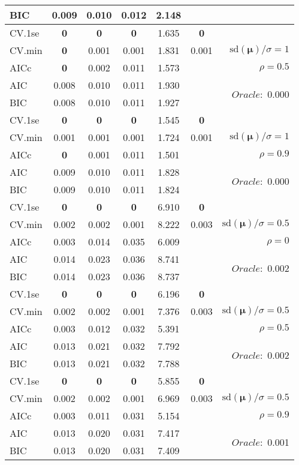 \begin{table}
\begin{center}
\begin{tabular}{l*{5}{c}|r}
BIC & 0.009 & 0.010 & 0.012 & 2.148 & &  \\
 \hline 
CV.1se & {\bf 0} & {\bf 0} & {\bf 0} & 1.635 & {\bf 0} & \\
CV.min & {\bf 0} & 0.001 & 0.001 & 1.831 & 0.001 &  $\mathrm{sd}(\mathbf{\mu})/\sigma=1$ \\
AICc & {\bf 0} & 0.002 & 0.011 & 1.573 & & $\rho=0.5$ \\
AIC & 0.008 & 0.010 & 0.011 & 1.930 & &  \multirow{2}{*}{$Oracle: $ 0.000} \\
BIC & 0.008 & 0.010 & 0.011 & 1.927 & &  \\
 \hline 
CV.1se & {\bf 0} & {\bf 0} & {\bf 0} & 1.545 & {\bf 0} & \\
CV.min & 0.001 & 0.001 & 0.001 & 1.724 & 0.001 &  $\mathrm{sd}(\mathbf{\mu})/\sigma=1$ \\
AICc & {\bf 0} & 0.001 & 0.011 & 1.501 & & $\rho=0.9$ \\
AIC & 0.009 & 0.010 & 0.011 & 1.828 & &  \multirow{2}{*}{$Oracle: $ 0.000} \\
BIC & 0.009 & 0.010 & 0.011 & 1.824 & &  \\
 \hline 
CV.1se & {\bf 0} & {\bf 0} & {\bf 0} & 6.910 & {\bf 0} & \\
CV.min & 0.002 & 0.002 & 0.001 & 8.222 & 0.003 &  $\mathrm{sd}(\mathbf{\mu})/\sigma=0.5$ \\
AICc & 0.003 & 0.014 & 0.035 & 6.009 & & $\rho=0$ \\
AIC & 0.014 & 0.023 & 0.036 & 8.741 & &  \multirow{2}{*}{$Oracle: $ 0.002} \\
BIC & 0.014 & 0.023 & 0.036 & 8.737 & &  \\
 \hline 
CV.1se & {\bf 0} & {\bf 0} & {\bf 0} & 6.196 & {\bf 0} & \\
CV.min & 0.002 & 0.002 & 0.001 & 7.376 & 0.003 &  $\mathrm{sd}(\mathbf{\mu})/\sigma=0.5$ \\
AICc & 0.003 & 0.012 & 0.032 & 5.391 & & $\rho=0.5$ \\
AIC & 0.013 & 0.021 & 0.032 & 7.792 & &  \multirow{2}{*}{$Oracle: $ 0.002} \\
BIC & 0.013 & 0.021 & 0.032 & 7.788 & &  \\
 \hline 
CV.1se & {\bf 0} & {\bf 0} & {\bf 0} & 5.855 & {\bf 0} & \\
CV.min & 0.002 & 0.002 & 0.001 & 6.969 & 0.003 &  $\mathrm{sd}(\mathbf{\mu})/\sigma=0.5$ \\
AICc & 0.003 & 0.011 & 0.031 & 5.154 & & $\rho=0.9$ \\
AIC & 0.013 & 0.020 & 0.031 & 7.417 & &  \multirow{2}{*}{$Oracle: $ 0.001} \\
BIC & 0.013 & 0.020 & 0.031 & 7.409 & &  \\
 \hline 
\end{tabular}
\end{center}
\vspace{-1cm}
\end{table}




